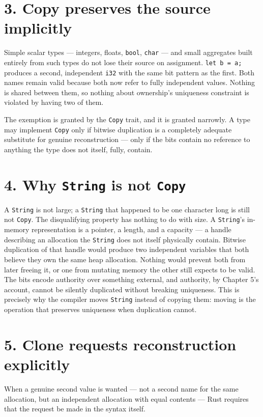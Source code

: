 \documentclass[11pt]{book}
\begin{document}
\section*{3. Copy preserves the source implicitly}

Simple scalar types --- integers, floats, \texttt{bool}, \texttt{char} --- and small aggregates built entirely from such types do not lose their source on assignment. \texttt{let b = a;} produces a second, independent \texttt{i32} with the same bit pattern as the first. Both names remain valid because both now refer to fully independent values. Nothing is shared between them, so nothing about ownership's uniqueness constraint is violated by having two of them.

The exemption is granted by the \texttt{Copy} trait, and it is granted narrowly. A type may implement \texttt{Copy} only if bitwise duplication is a completely adequate substitute for genuine reconstruction --- only if the bits contain no reference to anything the type does not itself, fully, contain.

\section*{4. Why \texttt{String} is not \texttt{Copy}}

A \texttt{String} is not large; a \texttt{String} that happened to be one character long is still not \texttt{Copy}. The disqualifying property has nothing to do with size. A \texttt{String}'s in-memory representation is a pointer, a length, and a capacity --- a handle describing an allocation the \texttt{String} does not itself physically contain. Bitwise duplication of that handle would produce two independent variables that both believe they own the same heap allocation. Nothing would prevent both from later freeing it, or one from mutating memory the other still expects to be valid. The bits encode authority over something external, and authority, by Chapter 5's account, cannot be silently duplicated without breaking uniqueness. This is precisely why the compiler moves \texttt{String} instead of copying them: moving is the operation that preserves uniqueness when duplication cannot.

\section*{5. Clone requests reconstruction explicitly}

When a genuine second value is wanted --- not a second name for the same allocation, but an independent allocation with equal contents --- Rust requires that the request be made in the syntax itself.
\end{document}
